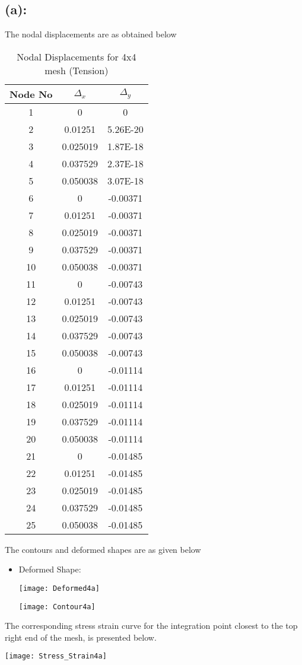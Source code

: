 \subsection*{(a): }
The nodal displacements are as obtained below
\begin{table}[h!]
  \centering
  \caption{Nodal Displacements for 4x4 mesh (Tension)}
    \begin{tabular}{ccc}
    \toprule
    {Node No} & {$\Delta_x$} & {$\Delta_y$} \\
    \midrule
    1     & 0     & 0 \\
    2     & 0.01251 & 5.26E-20 \\
    3     & 0.025019 & 1.87E-18 \\
    4     & 0.037529 & 2.37E-18 \\
    5     & 0.050038 & 3.07E-18 \\
    6     & 0     & -0.00371 \\
    7     & 0.01251 & -0.00371 \\
    8     & 0.025019 & -0.00371 \\
    9     & 0.037529 & -0.00371 \\
    10    & 0.050038 & -0.00371 \\
    11    & 0     & -0.00743 \\
    12    & 0.01251 & -0.00743 \\
    13    & 0.025019 & -0.00743 \\
    14    & 0.037529 & -0.00743 \\
    15    & 0.050038 & -0.00743 \\
    16    & 0     & -0.01114 \\
    17    & 0.01251 & -0.01114 \\
    18    & 0.025019 & -0.01114 \\
    19    & 0.037529 & -0.01114 \\
    20    & 0.050038 & -0.01114 \\
    21    & 0     & -0.01485 \\
    22    & 0.01251 & -0.01485 \\
    23    & 0.025019 & -0.01485 \\
    24    & 0.037529 & -0.01485 \\
    25    & 0.050038 & -0.01485 \\
    \bottomrule
    \end{tabular}%
  \label{Displacements4a}%
\end{table}%
\newpage The contours and deformed shapes are as given below
\begin{itemize}
\item Deformed Shape:
\begin{center}
\texttt{[image: Deformed4a]}
\end{center}
\begin{center}
\texttt{[image: Contour4a]}
\end{center}
\end{itemize}
\newpage The corresponding stress strain curve for the integration point closest to the top right end of the mesh, is presented below. 
\begin{center}
\texttt{[image: Stress\_Strain4a]}
\end{center}
